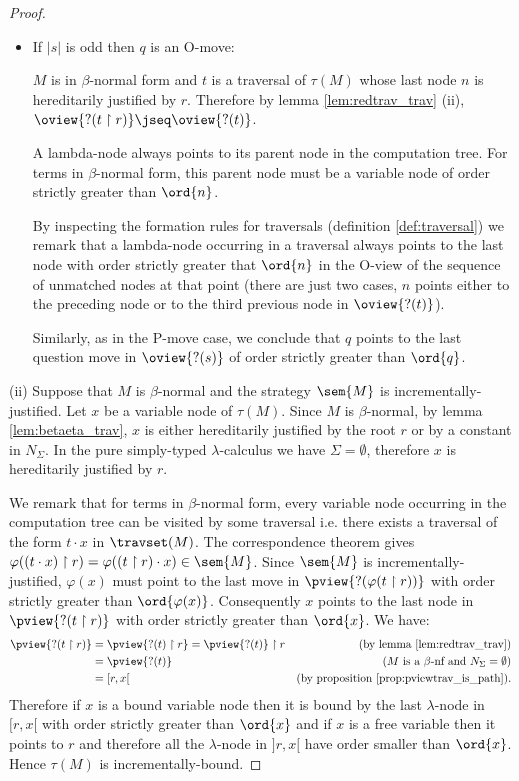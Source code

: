 \begin{proof}
\begin{itemize}
\item If $|s|$ is odd then $q$ is an O-move:

$M$ is in $\beta$-normal form and $t$ is a traversal of $\tau(M)$
whose last node $n$ is hereditarily justified by $r$. Therefore by lemma \ref{lem:redtrav_trav} (ii),
$ \oview{?(t \upharpoonright r)} \jseq \oview{?(t)}$.

A lambda-node always points to its parent node in the computation
tree. For terms in $\beta$-normal form, this parent node must be a
variable node of order strictly greater than $\ord{n}$.

By inspecting the formation rules for traversals (definition
\ref{def:traversal}) we remark that a lambda-node occurring in a
traversal always points to the last node with order strictly greater
that $\ord{n}$ in the O-view of the sequence of unmatched nodes at
that point (there are just two cases, $n$ points either to the
preceding node or to the third previous node in $\oview{?(t)}$).

Similarly, as in the P-move case, we conclude that $q$ points to the
last question move in $\oview{?(s)}$ of order strictly greater than
$\ord{q}$.
\end{itemize}

\noindent (ii) Suppose that $M$ is $\beta$-normal and the strategy
$\sem{M}$ is incrementally-justified. Let $x$ be a variable node of
$\tau(M)$. Since $M$ is $\beta$-normal, by lemma
\ref{lem:betaeta_trav}, $x$ is either hereditarily justified by the
root $r$ or by a constant in $N_\Sigma$. In the pure simply-typed
$\lambda$-calculus we have $\Sigma=\emptyset$, therefore $x$ is
hereditarily justified by $r$.


We remark that for terms in $\beta$-normal form, every variable node
occurring in the computation tree can be visited by some traversal
i.e. there exists a traversal of the form $t \cdot x$ in
$\travset(M)$. The correspondence theorem gives $\varphi((t \cdot x)
\upharpoonright r) = \varphi((t \upharpoonright r) \cdot x) \in
\sem{M}$. Since $\sem{M}$ is incrementally-justified, $\varphi(x)$
must point to the last move in $\pview{?(\varphi(t \upharpoonright
r))}$ with order strictly greater than $\ord{\varphi(x)}$.
Consequently $x$ points to the last node in $\pview{?(t
\upharpoonright r)}$ with order strictly greater than $\ord{x}$. We
have:
\begin{align*}
\pview{?(t \upharpoonright r)} &= \pview{?(t) \upharpoonright r} = \pview{?(t)} \upharpoonright r & (\mbox{by lemma \ref{lem:redtrav_trav}}) \\
& = \pview{?(t)} & (\mbox{$M$ is a $\beta$-nf and $N_\Sigma = \emptyset$}) \\
& = [r,x[ & (\mbox{by proposition \ref{prop:pviewtrav_is_path}}).
\end{align*}
Therefore if $x$ is a bound variable node then it is bound by the last $\lambda$-node in $[r,x[$ with order strictly greater than $\ord{x}$
and if $x$ is a free variable then it points to $r$ and therefore all the $\lambda$-node in $]r,x[$ have order smaller than $\ord{x}$.
Hence $\tau(M)$ is incrementally-bound.
\end{proof}


